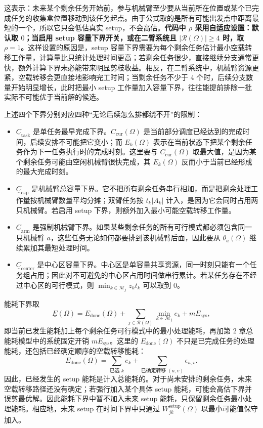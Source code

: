 这表示：未来某个剩余任务开始前，参与机械臂至少要从当前所在位置或某个已完成任务的收集盒位置移动到该任务起点。由于公式取的是所有可能出发点中距离最短的一个，所以它只会低估真实 setup，不会高估。\textbf{代码中 $\rho$ 采用自适应设置：默认取 $0$；当启用 setup 容量下界开关，或在二臂系统且 $|\mathcal{R}(\Omega)|\ge 4$ 时，取 $\rho=1$。}这样设置的原因是，setup 容量下界需要为每个剩余任务估计最小空载转移工作量，计算量比只统计处理时间更高；若剩余任务很少，直接继续分支通常更快，额外计算下界未必能带来明显剪枝收益。相反，在二臂系统中，机械臂资源更紧，空载转移会更直接地影响完工时间；当剩余任务不少于 4 个时，后续分支数量开始明显增长，此时把最小 setup 工作量加入容量下界，往往能提前排除一批实际不可能优于当前解的候选。

上述四个下界分别对应四种“无论后续怎么排都绕不开”的限制：
\begin{itemize}
    \item $\underline C_{\mathrm{task}}$ 是单任务最早完成下界。$C_{\mathrm{cur}}(\Omega)$ 是当前部分调度已经达到的完成时间，后续安排不可能把它变小；而 $E_k(\Omega)$ 表示在当前状态下把某个剩余任务作为下一任务执行时的完成时刻。这里要与 $C_{\mathrm{cur}}(\Omega)$ 取最大值，是因为某个剩余任务可能由空闲机械臂很快完成，其 $E_k(\Omega)$ 反而小于当前已经形成的最大完成时刻。
    \item $\underline C_{\mathrm{cap}}$ 是机械臂总容量下界。它不把所有剩余任务串行相加，而是把剩余处理工作量按机械臂数量平均分摊；双臂任务按 $t_k|A_k|$ 计入，是因为它会同时占用两只机械臂。若启用 setup 下界，则额外加入最小可能空载转移工作量。
    \item $\underline C_{\mathrm{arm}}$ 是强制机械臂下界。如果某些剩余任务的所有可行模式都必须包含同一只机械臂 $a$，这些任务无论如何都要排到该机械臂后面，因此要从 $\theta_a(\Omega)$ 继续累加其最短处理时间。
    \item $\underline C_{\mathrm{center}}$ 是中心区容量下界。中心区是单容量共享资源，同一时刻只能有一个任务组占用；因此对不可避免的中心区占用时间做串行累计。若某任务存在不经过中心区的可行模式，则 $\min_{k\in\mathcal{M}_j} z_kt_k$ 可以取到 0。
\end{itemize}

能耗下界取
\[
    \underline E(\Omega)
    = E_{\mathrm{done}}(\Omega)
    + \sum_{j\in\mathcal{R}(\Omega)} \min_{k\in\mathcal{M}_j} e_k
    + mE_{\mathrm{sys}},
\]
即当前已发生能耗加上每个剩余任务可行模式中的最小处理能耗，再加第 2 章总能耗模型中的系统固定开销 $mE_{\mathrm{sys}}$。这里的 $E_{\mathrm{done}}(\Omega)$ 不只是已完成任务的处理能耗，还包括已经确定顺序的空载转移能耗：
\[
    E_{\mathrm{done}}(\Omega)
    =
    \sum_{\text{已选 }k} e_k
    +\sum_{\text{已确定转移 }(u,v)} \epsilon_{u,v}.
\]
因此，已经发生的 setup 能耗是计入总能耗的。对于尚未安排的剩余任务，未来空载转移路径还没有确定；若强行加入某个具体 setup 能耗，可能会高估下界并误剪最优解。因此能耗下界中暂不加入未来 setup 能耗，只保留剩余任务最小处理能耗。相应地，未来 setup 在时间下界中只通过 $W_{jk}^{\mathrm{setup}}(\Omega)$ 以最小可能值保守加入。

